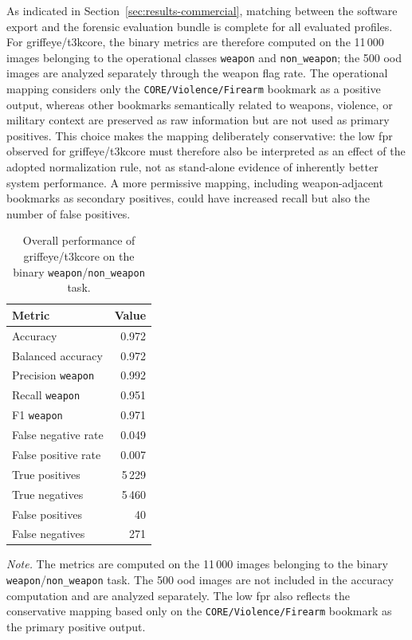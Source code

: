 As indicated in Section~\ref{sec:results-commercial}, matching between the
software export and the forensic evaluation bundle is complete for all
evaluated profiles. For \gls{griffeye}/\gls{t3kcore}, the binary metrics are
therefore computed on the 11\,000 images belonging to the operational classes
\texttt{weapon} and \texttt{non\_weapon}; the 500 \gls{ood} images are analyzed
separately through the weapon flag rate. The operational mapping considers only
the \texttt{CORE/Violence/Firearm} bookmark as a positive output, whereas other
bookmarks semantically related to weapons, violence, or military context are
preserved as raw information but are not used as primary positives. This choice
makes the mapping deliberately conservative: the low \gls{fpr} observed for
\gls{griffeye}/\gls{t3kcore} must therefore also be interpreted as an effect of
the adopted normalization rule, not as stand-alone evidence of inherently better
system performance. A more permissive mapping, including weapon-adjacent
bookmarks as secondary positives, could have increased recall but also the
number of false positives.

\begin{table}[H]
\centering
\caption{Overall performance of \gls{griffeye}/\gls{t3kcore} on the binary \texttt{weapon}/\texttt{non\_weapon} task.}
\label{tab:results-griffeye-global-metrics}
\small
\begin{tabular}{lr}
\toprule
\textbf{Metric} & \textbf{Value} \\
\midrule
Accuracy & 0.972 \\
Balanced accuracy & 0.972 \\
Precision \texttt{weapon} & 0.992 \\
Recall \texttt{weapon} & 0.951 \\
F1 \texttt{weapon} & 0.971 \\
False negative rate & 0.049 \\
False positive rate & 0.007 \\
True positives & 5\,229 \\
True negatives & 5\,460 \\
False positives & 40 \\
False negatives & 271 \\
\bottomrule
\end{tabular}

\vspace{0.4em}
\footnotesize
\textit{Note.} The metrics are computed on the 11\,000 images belonging to the
binary \texttt{weapon}/\texttt{non\_weapon} task. The 500 \gls{ood} images are
not included in the accuracy computation and are analyzed separately. The low
\gls{fpr} also reflects the conservative mapping based only on the
\texttt{CORE/Violence/Firearm} bookmark as the primary positive output.
\end{table}

